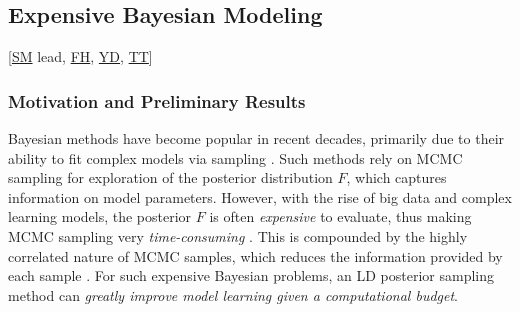 \documentclass[11pt]{NSFamsart}
\newcommand{\FH}{\hyperlink{FHlink}{FH}\xspace}
\newcommand{\SM}{\hyperlink{SMlink}{SM}\xspace}
\newcommand{\TT}{\hyperlink{TTlink}{TT}\xspace}
\newcommand{\YD}{\hyperlink{YDlink}{YD}\xspace}
\begin{document}

\subsection{Expensive Bayesian Modeling} [\SM lead, \FH, \YD, \TT{}] \label{sec:bayes}

\subsubsection{Motivation and Preliminary Results}
Bayesian methods have become popular in recent decades, primarily due to their ability to fit complex models via sampling \cite{GelEtal13}. Such methods rely on MCMC sampling for exploration of the posterior distribution $F$, which captures information on model parameters. However, with the rise of big data and complex learning models, the posterior $F$ is often \textit{expensive} to evaluate, thus making MCMC sampling very \textit{time-consuming} \cite{joseph2015sequential}. This is compounded by the highly correlated nature of MCMC samples, which reduces the information provided by each sample \citep{link2012thinning}. For such expensive Bayesian problems, an LD posterior sampling method can \textit{greatly improve model learning given a computational budget}.

\end{document}
